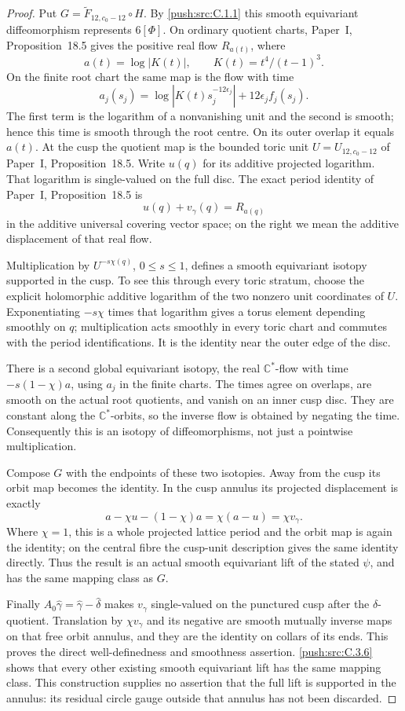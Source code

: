 \begin{proof}
Put $G=\widetilde F_{12,c_0-12}\circ H$. By \ref{push:src:C.1.1} this smooth
equivariant diffeomorphism represents $6[\Phi]$. On ordinary
quotient charts, Paper~I, Proposition~18.5 gives the positive real flow
$R_{a(t)}$, where
\[
 a(t)=\log|K(t)|,\qquad K(t)=t^4/(t-1)^3.
\]
On the finite root chart the same map is the flow with time
\[
 a_j(s_j)=\log|K(t)s_j^{-12\epsilon_j}|
                       +12\epsilon_j f_j(s_j).
\]
The first term is the logarithm of a nonvanishing unit and the
second is smooth; hence this time is smooth through the root
centre. On its outer overlap it equals $a(t)$. At the cusp the
quotient map is the bounded toric unit $U=U_{12,c_0-12}$ of
Paper~I, Proposition~18.5. Write $u(q)$ for its additive projected logarithm.
That logarithm is single-valued on the full disc. The exact
period identity of Paper~I, Proposition~18.5 is
\[
 u(q)+v_\gamma(q)=R_{a(q)}
\]
in the additive universal covering vector space; on the right
we mean the additive displacement of that real flow.

Multiplication by $U^{-s\chi(q)}$, $0\leq s\leq1$, defines a
smooth equivariant isotopy supported in the cusp. To see this
through every toric stratum, choose the explicit holomorphic
additive logarithm of the two nonzero unit coordinates of $U$.
Exponentiating $-s\chi$ times that logarithm gives a torus
element depending smoothly on $q$; multiplication acts smoothly
in every toric chart and commutes with the period identifications.
It is the identity near the outer edge of the disc.

There is a second global equivariant isotopy, the real
$\mathbb C^*$-flow with time $-s(1-\chi)a$, using $a_j$ in
the finite charts. The times agree on overlaps, are smooth on
the actual root quotients, and vanish on an inner cusp disc.
They are constant along the $\mathbb C^*$-orbits, so the inverse
flow is obtained by negating the time. Consequently this is an
isotopy of diffeomorphisms, not just a pointwise multiplication.

Compose $G$ with the endpoints of these two isotopies. Away
from the cusp its orbit map becomes the identity. In the cusp
annulus its projected displacement is exactly
\[
 a-\chi u-(1-\chi)a=\chi(a-u)=\chi v_\gamma.
\]
Where $\chi=1$, this is a whole projected lattice period and
the orbit map is again the identity; on the central fibre the
cusp-unit description gives the same identity directly. Thus the
result is an actual smooth equivariant lift of the stated $\psi$,
and has the same mapping class as $G$.

Finally $A_0\widehat\gamma=\widehat\gamma-\widehat\delta$
makes $v_\gamma$ single-valued on the punctured cusp after the
$\delta$-quotient. Translation by $\chi v_\gamma$ and its
negative are smooth mutually inverse maps on that free orbit
annulus, and they are the identity on collars of its ends.
This proves the direct well-definedness and smoothness assertion.
\ref{push:src:C.3.6} shows that every other existing smooth equivariant lift has
the same mapping class. This construction supplies no assertion
that the full lift is supported in the annulus: its residual
circle gauge outside that annulus has not been discarded.
\end{proof}
